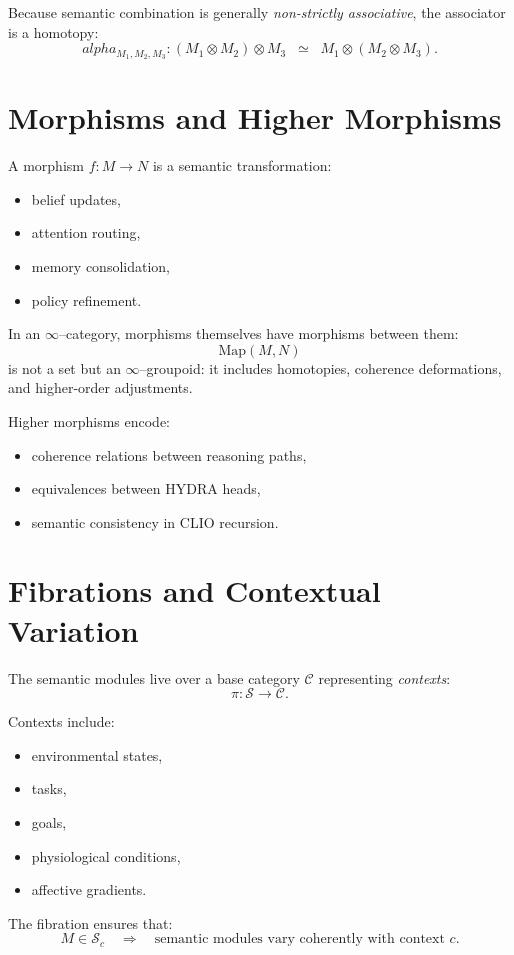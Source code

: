 \documentclass[12pt,oneside]{book}
\theoremstyle{plain}
\theoremstyle{definition}
\def\alpha{alpha}%
\begin{document}
Because semantic combination is generally \emph{non-strictly associative}, the associator is a homotopy:
\[
\alpha_{M_1,M_2,M_3}: (M_1 \otimes M_2) \otimes M_3 
\;\;\simeq\;\;
M_1 \otimes (M_2 \otimes M_3).
\]

\section{Morphisms and Higher Morphisms}

A morphism $f: M \to N$ is a semantic transformation:
\begin{itemize}
  \item belief updates,
  \item attention routing,
  \item memory consolidation,
  \item policy refinement.
\end{itemize}

In an $\infty$--category, morphisms themselves have morphisms between them:
\[
\mathrm{Map}(M,N)
\]
is not a set but an $\infty$--groupoid:  
it includes homotopies, coherence deformations, and higher-order adjustments.

Higher morphisms encode:
\begin{itemize}
  \item coherence relations between reasoning paths,
  \item equivalences between HYDRA heads,
  \item semantic consistency in CLIO recursion.
\end{itemize}

\section{Fibrations and Contextual Variation}

The semantic modules live over a base category $\mathcal{C}$ representing \emph{contexts}:
\[
\pi: \mathcal{S} \to \mathcal{C}.
\]

Contexts include:
\begin{itemize}
  \item environmental states,
  \item tasks,
  \item goals,
  \item physiological conditions,
  \item affective gradients.
\end{itemize}

The fibration ensures that:
\[
M \in \mathcal{S}_{c}
\quad \Rightarrow \quad
\text{semantic modules vary coherently with context $c$}.
\]
\end{document}
